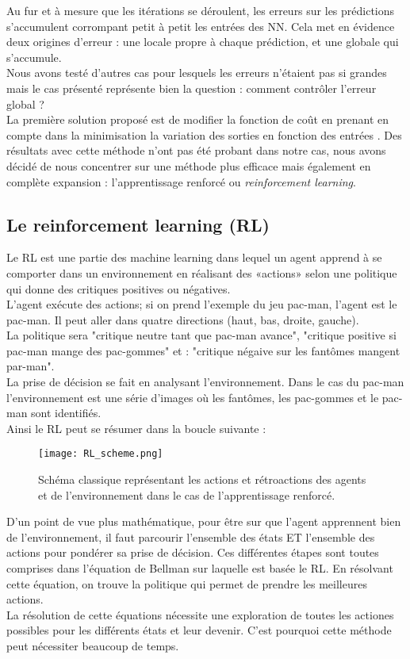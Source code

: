 \documentclass[a4paper,12pt]{article}
\newcommand\bk{\color{black}}
\newcommand\brick{\color{brick}}
\numberwithin{equation}{section} %
\begin{document}
\noindent Au fur et à mesure que les itérations se déroulent, les erreurs sur les prédictions s'accumulent corrompant petit à petit les entrées des NN. Cela met en évidence deux origines d'erreur : une locale propre à chaque prédiction, et une globale qui s'accumule.\\
Nous avons testé d'autres cas pour lesquels les erreurs n'étaient pas si grandes mais le cas présenté représente bien la question : comment contrôler l'erreur global ?\\
La première solution proposé est de modifier la fonction de coût en prenant en compte dans la minimisation la variation des sorties en fonction des entrées \citep{pan2018long}. Des résultats avec cette méthode n'ont pas été probant dans notre cas, nous avons décidé de nous concentrer sur une méthode plus efficace mais également en complète expansion : l'apprentissage renforcé ou \textit{reinforcement learning}.

\brick \subsection{Le reinforcement learning (RL)} \bk \label{sec_REIL}
\noindent Le RL est une partie des machine learning dans lequel un agent apprend à se comporter dans un environnement en réalisant des «actions» selon une politique qui donne des critiques positives ou négatives.\\
L'agent exécute des actions; si on prend l'exemple du jeu pac-man, l'agent est le pac-man. Il peut aller dans quatre directions (haut, bas, droite, gauche). \\
La politique sera "critique neutre  tant que pac-man avance", "critique positive si pac-man mange des pac-gommes" et : "critique négaive sur les fantômes mangent par-man".\\
La prise de décision se fait en analysant l'environnement. Dans le cas du pac-man l'environnement est une série d'images où les fantômes, les pac-gommes et le pac-man sont identifiés.\\
 Ainsi le RL peut se résumer dans la boucle suivante : 
\begin{figure}[!ht]
 \centering
 \texttt{[image: RL\_scheme.png]}
 \caption{\small{Schéma classique représentant les actions et rétroactions des agents et de l'environnement dans le cas de l'apprentissage renforcé.}}
 \label{boucleRL}
 \end{figure} 
 
 \noindent D'un point de vue plus mathématique, pour être sur que l'agent apprennent bien de l'environnement, il faut parcourir l'ensemble des états ET l'ensemble des actions pour pondérer sa prise de décision. Ces différentes étapes sont toutes comprises dans l'équation de Bellman sur laquelle est basée le RL. En résolvant cette équation, on trouve la politique qui permet de prendre les meilleures actions. \\
La résolution de cette équations nécessite une exploration de toutes les actiones possibles pour les différents états et leur devenir. C'est pourquoi cette méthode peut nécessiter beaucoup de temps. \\
\end{document}
